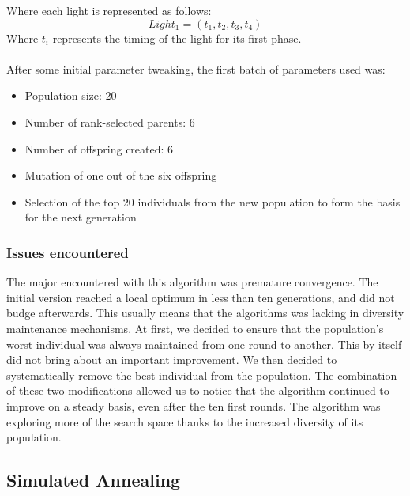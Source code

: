 \documentclass{article} %
\begin{document}
Where each light is represented as follows:
\begin{equation}
 Light_1 = (t_1, t_2, t_3, t_4)
\end{equation}
Where $t_i$ represents the timing of the light for its first phase. \\
$\;$\\
After some initial parameter tweaking, the first batch of parameters used was:
\begin{itemize}
 \item Population size: 20
 \item Number of rank-selected parents: 6
 \item Number of offspring created: 6
 \item Mutation of one out of the six offspring
 \item Selection of the top 20 individuals from the new population to form the basis for the next generation
\end{itemize}


\subsubsection{Issues encountered}
The major encountered with this algorithm was premature convergence. The initial version reached a local optimum in less than ten generations, and did not budge afterwards. This usually means that the algorithms was lacking in diversity maintenance mechanisms. At first, we decided to ensure that the population's worst individual was always maintained from one round to another. This by itself did not bring about an important improvement. 
We then decided to systematically remove the best individual from the population. The combination of these two modifications allowed us to notice that the algorithm continued to improve on a steady basis, even after the ten first rounds. The algorithm was exploring more of the search space thanks to the increased diversity of its population.


\subsection{Simulated Annealing}
\end{document}
